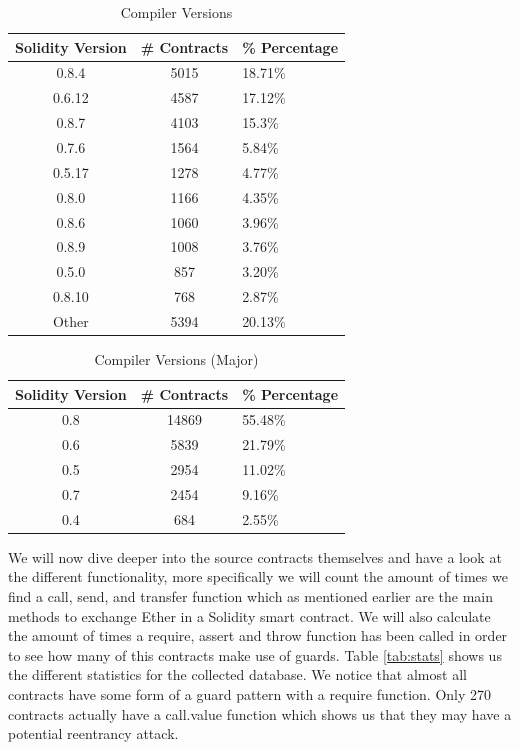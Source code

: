 \documentclass[10pt,conference]{IEEEtran}
\begin{document}
\begin{table}
  \caption{Compiler Versions}
  \label{tab:versions}
  \begin{tabular}{ccl}
    \hline
    Solidity Version & \# Contracts & \% Percentage\\
    \hline
    0.8.4&5015&18.71\%\\
    0.6.12&4587&17.12\%\\
    0.8.7&4103&15.3\%\\
    0.7.6&1564&5.84\%\\
    0.5.17&1278&4.77\%\\
    0.8.0&1166&4.35\%\\
    0.8.6&1060&3.96\%\\
    0.8.9&1008&3.76\%\\
    0.5.0&857&3.20\%\\
    0.8.10&768&2.87\%\\
    Other&5394&20.13\%\\
  \hline
\end{tabular}
\end{table}

\begin{table}
  \caption{Compiler Versions (Major)}
  \label{tab:versions}
  \begin{tabular}{ccl}
    \hline
    Solidity Version & \# Contracts & \% Percentage\\
    \hline
    0.8&14869&55.48\%\\
    0.6&5839&21.79\%\\
    0.5&2954&11.02\%\\
    0.7&2454&9.16\%\\
    0.4&684&2.55\%\\
  \hline
\end{tabular}
\end{table}
We will now dive deeper into the source contracts themselves and have a look at the different functionality, more specifically we will count the amount of times we find a call, send, and transfer function which as mentioned earlier are the main methods to exchange Ether in a Solidity smart contract. We will also calculate the amount of times a require, assert and throw function has been called in order to see how many of this contracts make use of guards. Table \ref{tab:stats} shows us the different statistics for the collected database. We notice that almost all contracts have some form of a guard pattern with a require function. Only 270 contracts actually have a call.value function which shows us that they may have a potential reentrancy attack. 
\end{document}
